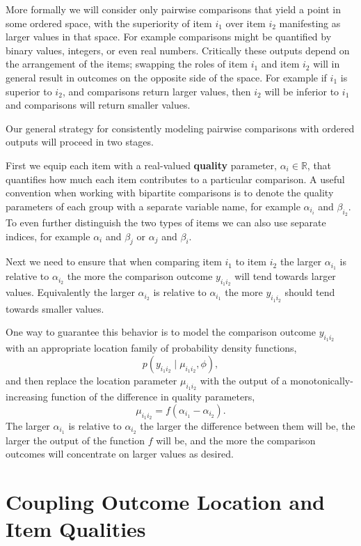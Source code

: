 \documentclass[
  letterpaper,
  DIV=11,
  numbers=noendperiod]{scrartcl}
\begin{document}
More formally we will consider only pairwise comparisons that yield a
point in some ordered space, with the superiority of item \(i_{1}\) over
item \(i_{2}\) manifesting as larger values in that space. For example
comparisons might be quantified by binary values, integers, or even real
numbers. Critically these outputs depend on the arrangement of the
items; swapping the roles of item \(i_{1}\) and item \(i_{2}\) will in
general result in outcomes on the opposite side of the space. For
example if \(i_{1}\) is superior to \(i_{2}\), and comparisons return
larger values, then \(i_{2}\) will be inferior to \(i_{1}\) and
comparisons will return smaller values.

Our general strategy for consistently modeling pairwise comparisons with
ordered outputs will proceed in two stages.

First we equip each item with a real-valued \textbf{quality} parameter,
\(\alpha_{i} \in \mathbb{R}\), that quantifies how much each item
contributes to a particular comparison. A useful convention when working
with bipartite comparisons is to denote the quality parameters of each
group with a separate variable name, for example \(\alpha_{i_{i}}\) and
\(\beta_{i_{2}}\). To even further distinguish the two types of items we
can also use separate indices, for example \(\alpha_{i}\) and
\(\beta_{j}\) or \(\alpha_{j}\) and \(\beta_{i}\).

Next we need to ensure that when comparing item \(i_{1}\) to item
\(i_{2}\) the larger \(\alpha_{i_{1}}\) is relative to
\(\alpha_{i_{2}}\) the more the comparison outcome \(y_{i_{1} i_{2}}\)
will tend towards larger values. Equivalently the larger
\(\alpha_{i_{2}}\) is relative to \(\alpha_{i_{1}}\) the more
\(y_{i_{1} i_{2}}\) should tend towards smaller values.

One way to guarantee this behavior is to model the comparison outcome
\(y_{i_{1} i_{2}}\) with an appropriate location family of probability
density functions, \[
p(y_{i_{1} i_{2}} \mid \mu_{i_{1} i_{2}}, \phi),
\] and then replace the location parameter \(\mu_{i_{1} i_{2}}\) with
the output of a monotonically-increasing function of the difference in
quality parameters, \[
\mu_{i_{1} i_{2}} = f(\alpha_{i_{1}} - \alpha_{i_{2}}).
\] The larger \(\alpha_{i_{1}}\) is relative to \(\alpha_{i_{2}}\) the
larger the difference between them will be, the larger the output of the
function \(f\) will be, and the more the comparison outcomes will
concentrate on larger values as desired.

\section{Coupling Outcome Location and Item
Qualities}\label{coupling-outcome-location-and-item-qualities}
\end{document}
